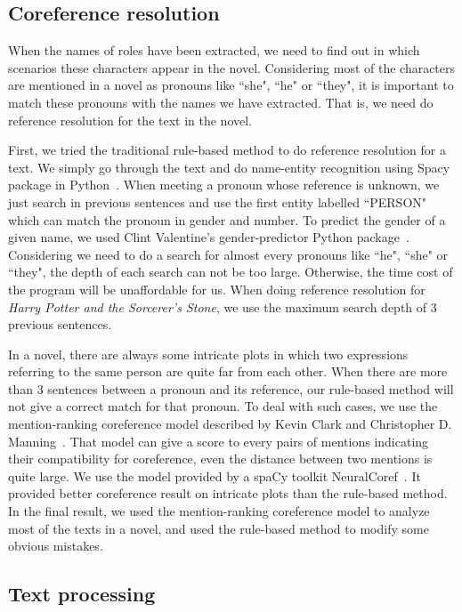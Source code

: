 \documentclass[11pt]{article}
\begin{document}
\subsection{Coreference resolution} %
\label{sect:pdf}

When the names of roles have been extracted, we need to find out in which scenarios these characters appear in the novel. Considering most of the characters are mentioned in a novel as pronouns like ``she", ``he" or ``they", it is important to match these pronouns with the names we have extracted. That is, we need do reference resolution for the text in the novel.

First, we tried the traditional rule-based method to do reference resolution for a text. We simply go through the text and do name-entity recognition using Spacy package in Python~\cite{honnibal-johnson:2015:EMNLP}. When meeting a pronoun whose reference is unknown, we just search in previous sentences and use the first entity labelled ``PERSON" which can match the pronoun in gender and number. To predict the gender of a given name, we used Clint Valentine's gender-predictor Python package~\cite{gender_predictor}. Considering we need to do a search for almost every pronouns like ``he", ``she" or ``they", the depth of each search can not be too large. Otherwise, the time cost of the program will be unaffordable for us. When doing reference resolution for \textit{Harry Potter and the Sorcerer's Stone}, we use the maximum search depth of 3 previous sentences.

In a novel, there are always some intricate plots in which two expressions referring to the same person are quite far from each other. When there are more than 3 sentences between a pronoun and its reference, our rule-based method will not give a correct match for that pronoun. To deal with such cases, we use the mention-ranking coreference model described by Kevin Clark and Christopher D. Manning~\cite{clark-manning-2016-deep}. That model can give a score to every pairs of mentions indicating their compatibility for coreference, even the distance between two mentions is quite large. We use the model provided by a spaCy toolkit NeuralCoref~\cite{neuralcoref}. It provided better coreference result on intricate plots than the rule-based method. In the final result, we used the mention-ranking coreference model to analyze most of the texts in a novel, and used the rule-based method to modify some obvious mistakes.


\subsection{Text processing} %
\label{ssec:layout}
\end{document}
